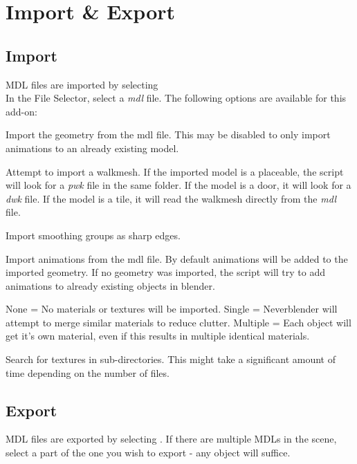 \chapter{Import \& Export}

\section{Import}
MDL files are imported by selecting  \\

In the File Selector, select a \textit{mdl} file. 
The following options are available for this add-on: 

\begin{description}[leftmargin=13em,style=nextline]
    \item[Import Geometry] Import the geometry from the mdl file. This may be disabled to only import animations to an already existing model.
    \item[Import Walkmesh] Attempt to import a walkmesh. If the imported model is a placeable, the script will look for a {\textit{pwk}} file in the same folder. If the model is a door, it will look for a {\textit{dwk}} file. If the model is a tile, it will read the walkmesh directly from the \textit{mdl} file.
    \item[Import Smooth Groups] Import smoothing groups as sharp edges.
    \item[Import Animations] Import animations from the mdl file. By default animations will be added to the imported geometry. If no geometry was imported, the script will try to add animations to already existing objects in blender.
    \item[Materials] None = No materials or textures will be imported. Single = Neverblender will attempt to merge similar materials to reduce clutter. Multiple = Each object will get it's own material, even if this results in multiple identical materials.
    \item[Image Search] Search for textures in sub-directories. This might take a significant amount of time depending on the number of files.
\end{description}

\section{Export}
MDL files are exported by selecting . If there are multiple MDLs in the scene,
select a part of the one you wish to export - any object will suffice. \\

